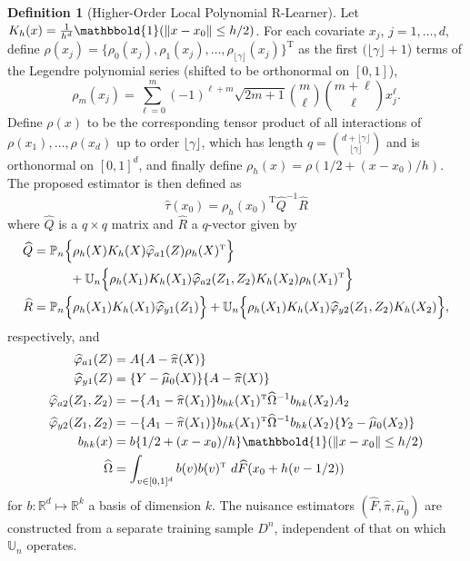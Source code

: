 \documentclass[11pt,twoside]{article}
\def\T{{ \mathrm{\scriptscriptstyle T} }}
\newcommand{\Pn}{\mathbb{P}_n}
\newcommand{\Un}{\mathbb{U}_n}
\newcommand{\R}{\mathbb{R}}
\newcommand{\one}{\mathbbold{1}}
\theoremstyle{definition}
\newtheorem{definition}{Definition}
\theoremstyle{remark}
\begin{document}
\begin{definition}[Higher-Order Local Polynomial R-Learner] \label{def:estimator} 
Let $K_h(x) = \frac{1}{h^d} \one(\|x-x_0\| \leq h/2)$. For each covariate $x_j$, $j=1,\dots,d,$ define 
$ \rho(x_j) = \{ \rho_0(x_j), \rho_1(x_j), \dots, \rho_{\lfloor \gamma \rfloor}(x_j) \}^\T $ 
as the first $({\lfloor \gamma \rfloor}+1$) terms of the  Legendre polynomial series (shifted to be orthonormal on  $[0,1]$), 
$$ \rho_{m}(x_j) = \sum_{\ell=0}^m (-1)^{\ell+m} \sqrt{2m+1}  {m \choose \ell} { m + \ell \choose \ell} x_j^\ell . $$
Define $\rho(x)$ to be the corresponding tensor product of all interactions of $\rho(x_1),\dots,\rho(x_d)$ up to order $\lfloor \gamma \rfloor$, which has length  $q = {{ d + \lfloor \gamma \rfloor } \choose { \lfloor\gamma \rfloor }}$ and is orthonormal on $[0,1]^d$, and finally define $\rho_h(x) = \rho\left( 1/2+ (x-x_0)/h \right)$. 
The proposed estimator is then defined as
\begin{equation} \label{eq:estimator}
\widehat\tau(x_0) = \rho_h(x_0)^\T \widehat{Q}^{-1} \widehat{R} 
\end{equation}
where $\widehat{Q}$ is a $q \times q$ matrix and $\widehat{R}$ a $q$-vector given by
\begin{align*}
\widehat{Q} &= \Pn \Big\{  \rho_h(X) K_h(X)\widehat\varphi_{a1}(Z)  \rho_h(X)^\T  \Big\} \\
& \hspace{.4in} + \Un \Big\{ \rho_h(X_1) K_h(X_1) \widehat\varphi_{a2}(Z_1,Z_2) K_h(X_2) \rho_h(X_1)^\T \Big\} \\
\widehat{R} &=  \Pn \Big\{  \rho_h(X_1) K_h(X_1)  \widehat\varphi_{y1}(Z_1) \Big\} + \Un \Big\{  \rho_h(X_1) K_h(X_1) \widehat\varphi_{y2}(Z_1,Z_2) K_h(X_2) \Big\} , 
\end{align*}
respectively, and 
\begin{align*}
\widehat\varphi_{a1}(Z) &= A\{A-\widehat\pi(X)\} \\
\widehat\varphi_{y1}(Z) &= \{Y - \widehat\mu_0(X) \} \{A-\widehat\pi(X)\} \\
\widehat\varphi_{a2}(Z_1,Z_2) &= -\{ A_1 - \widehat\pi(X_1)\} b_{hk}(X_1)^\T \widehat\Omega^{-1} b_{hk}(X_2) A_2  \\
\widehat\varphi_{y2}(Z_1,Z_2) &= -\{A_1 - \widehat\pi(X_1)\} b_{hk}(X_1)^\T \widehat\Omega^{-1} b_{hk}(X_2) \{Y_2 - \widehat\mu_0(X_2)\}  \\
b_{hk}(x) &=  b\{1/2 + (x-x_0)/h\} \one(\|x-x_0 \| \leq h/2) \\
\widehat\Omega &= \int_{v \in [0,1]^d} b(v) b(v)^\T \ d\widehat{F}(x_0 + h(v-1/2)) 
\end{align*}
for $b: \R^d \mapsto \R^k$ a basis of dimension $k$. 
The nuisance estimators $( \widehat{F}, \widehat\pi,\widehat\mu_0)$ are constructed from a separate training sample $D^n$, independent of that on which $\Un$ operates. 
\end{definition}
\end{document}
